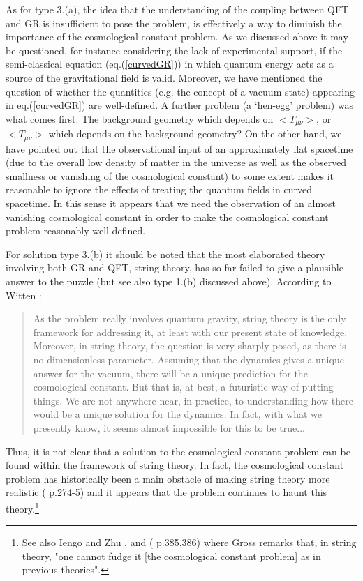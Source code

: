 \documentclass[12pt]{article}
\begin{document}
As for type 3.(a), the idea that the understanding of the coupling
between QFT and GR is insufficient to pose the problem, is
effectively a way to diminish the importance of the cosmological
constant problem. As we discussed above it may be questioned, for
instance considering the lack of experimental support, if the
semi-classical equation (eq.(\ref{curvedGR})) in which quantum
energy acts as a source of the gravitational field is valid.
Moreover, we have mentioned the question of whether the quantities
(e.g. the concept of a vacuum state) appearing in
eq.(\ref{curvedGR}) are well-defined. A further problem (a
`hen-egg' problem) was what comes first: The background geometry
which depends on $<T_{\mu\nu}>$, or $<T_{\mu\nu}>$ which depends
on the background geometry? On the other hand, we have pointed out
that the observational input of an approximately flat spacetime
(due to the overall low density of matter in the universe as well
as the observed smallness or vanishing of the cosmological
constant) to some extent makes it reasonable to ignore the effects
of treating the quantum fields in curved spacetime. In this sense
it appears that we need the observation of an almost vanishing
cosmological constant in order to make the cosmological constant
problem reasonably well-defined. 

For solution type 3.(b) it should be noted that the most
elaborated theory involving both GR and QFT, string theory, has so
far failed to give a plausible answer to the puzzle (but see also
type 1.(b) discussed above). According to
Witten \cite{witten00}:
\begin{quote}  
As the problem really involves quantum gravity, string theory
is the only framework for addressing it, at least with our
present state of knowledge. Moreover, in string theory, the 
question is very sharply posed, as there is no dimensionless
parameter. Assuming that the dynamics gives a unique answer
for the vacuum, there will be a unique prediction for the
cosmological constant. But that is, at best, a futuristic
way of putting things. We are not anywhere near, in practice,
to understanding how there would be a unique solution for
the dynamics. In fact, with what we presently know, it seems
almost impossible for this to be true...
\end{quote}
Thus, it is not clear that a solution to the cosmological constant
problem can be found within the framework of string theory. In
fact, the cosmological constant problem has historically been a
main obstacle of making string theory more realistic
(\cite{witten97} p.274-5) and it appears that the problem
continues to haunt this theory.\footnote{See also Iengo and Zhu
\cite{iengo99}, and (\cite{cao99} p.385,386) where Gross remarks
that, in string theory, "one cannot fudge it [the cosmological
constant problem] as in previous theories".} 
\end{document}

